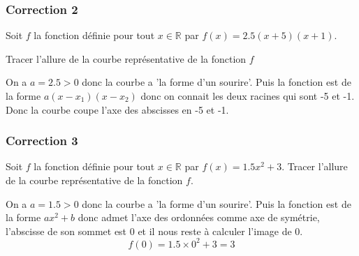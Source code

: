 \documentclass[15pt, mathserif]{beamer}
\newcommand{\R}{\mathbb{R}}			%
\begin{document}
\begin{frame}
\vspace{-10mm}
	\frametitle{Correction 2}
 \vspace*{1cm} Soit $f$ la fonction définie pour tout $x \in \R$ par $f(x)=2.5(x+5)(x+1)$. 
 
  Tracer l'allure de la courbe représentative de la fonction $f$ 
 
 \begin{multicols}{2} 
 On a $a=2.5>0$ donc la courbe a 'la forme d'un sourire'. Puis la fonction est de la forme $a(x-x_1)(x-x_2)$ donc on connait les deux racines qui sont -5 et -1. Donc la courbe coupe l'axe des abscisses en -5 et -1. 
 
  \columnbreak  
 
 \end{multicols} 
 \end{frame}


\begin{frame}
\vspace{-10mm}
	\frametitle{Correction 3}
\vspace*{1cm} 
 Soit $f$ la fonction définie pour tout $x \in \R$ par $f(x)=1.5x^2 +3$. Tracer l'allure de la courbe représentative de la fonction $f$. 
 
 \begin{multicols}{2} 
 On a $a=1.5>0$ donc la courbe a 'la forme d'un sourire'. Puis la fonction est de la forme $ax^2+b$ donc admet l'axe des ordonnées comme axe de symétrie, l'abscisse de son sommet est 0 et il nous reste à calculer l'image de 0. $$f(0)= 1.5\times 0^2+3=3$$ 
 
  \columnbreak  
 
 \end{multicols} 
 \end{frame}
\end{document}
